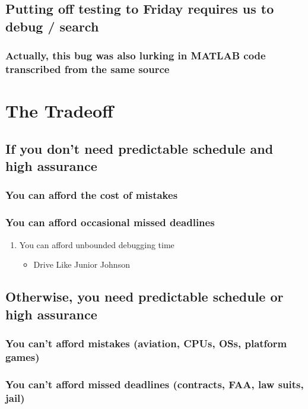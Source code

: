 \documentclass[10pt,oneside,x11names]{article}
\begin{document}
\subsection{Putting off testing to Friday requires us to debug / search}
\label{sec:orgeacaf70}
\subsubsection{Actually, this bug was also lurking in MATLAB code transcribed from the same source}
\label{sec:orgea45ae8}

\section{The Tradeoff}
\label{sec:orgc119f70}
\subsection{If you don't need predictable schedule and high assurance}
\label{sec:orgc00a3da}
\subsubsection{You can afford the cost of mistakes}
\label{sec:org361dc2e}
\subsubsection{You can afford occasional missed deadlines}
\label{sec:org964b8e0}
\begin{enumerate}
\item You can afford unbounded debugging time
\label{sec:orge19fef5}
\begin{itemize}
\item Drive Like Junior Johnson
\end{itemize}
\end{enumerate}
\subsection{Otherwise, you need predictable schedule or high assurance}
\label{sec:org74da424}
\subsubsection{You can't afford mistakes (aviation, CPUs, OSs, platform games)}
\label{sec:org6b3ba30}
\subsubsection{You can't afford missed deadlines (contracts, FAA, law suits, jail)}
\label{sec:orgaa33704}
\end{document}
